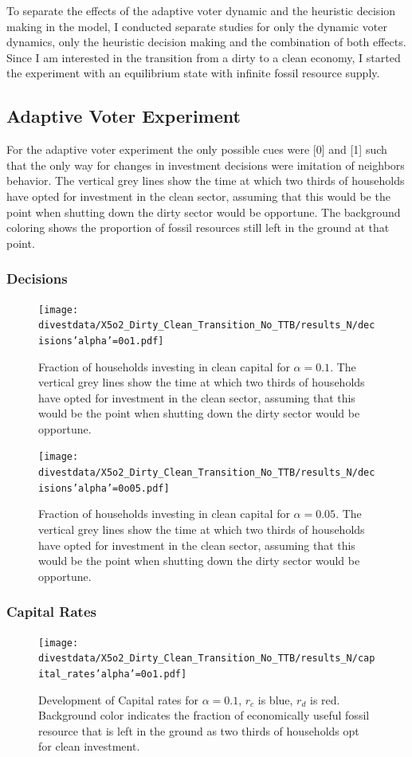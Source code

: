 To separate the effects of the adaptive voter dynamic and the heuristic decision making in the model, I conducted separate studies for only the dynamic voter dynamics, only the heuristic decision making and the combination of both effects. \\
Since I am interested in the transition from a dirty to a clean economy, I started the experiment with an equilibrium state with infinite fossil resource supply.

\subsection{Adaptive Voter Experiment}
For the adaptive voter experiment the only possible cues were [0] and [1] such that the only way for changes in investment decisions were imitation of neighbors behavior.
The vertical grey lines show the time at which two thirds of households have opted for investment in the clean sector, assuming that this would be the point when shutting down the dirty sector would be opportune. The background coloring shows the proportion of fossil resources still left in the ground at that point.
\subsubsection{Decisions}
\begin{figure}[H]
	\centering
	\texttt{[image: divestdata/X5o2\_Dirty\_Clean\_Transition\_No\_TTB/results\_N/decisions'alpha'=0o1.pdf]}
	\caption{Fraction of households investing in clean capital for $\alpha=0.1$. The vertical grey lines show the time at which two thirds of households have opted for investment in the clean sector, assuming that this would be the point when shutting down the dirty sector would be opportune. }
\end{figure}
\begin{figure}[H]
	\centering
	\texttt{[image: divestdata/X5o2\_Dirty\_Clean\_Transition\_No\_TTB/results\_N/decisions'alpha'=0o05.pdf]}
	\caption{Fraction of households investing in clean capital for $\alpha=0.05$. The vertical grey lines show the time at which two thirds of households have opted for investment in the clean sector, assuming that this would be the point when shutting down the dirty sector would be opportune. }

\end{figure}
\subsubsection{Capital Rates}
\begin{figure}[H]
	\centering
	\texttt{[image: divestdata/X5o2\_Dirty\_Clean\_Transition\_No\_TTB/results\_N/capital\_rates'alpha'=0o1.pdf]}
	\caption{Development of Capital rates for $\alpha=0.1$, $r_c$ is blue, $r_d$ is red. Background color indicates the fraction of economically useful fossil resource that is left in the ground as two thirds of households opt for clean investment.}
	\label{5o2_3}
\end{figure}

